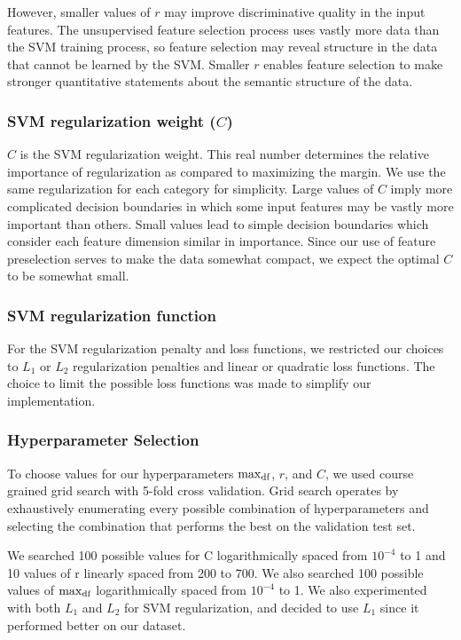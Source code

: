 However, smaller values of $r$ may improve discriminative quality in the input features.
The unsupervised feature selection process uses vastly more data than the SVM training process, so feature selection may reveal structure in the data that cannot be learned by the SVM.
Smaller $r$ enables feature selection to make stronger quantitative statements about the semantic structure of the data.

\subsubsection{SVM regularization weight ($C$)}
$C$ is the SVM regularization weight.
This real number determines the relative importance of regularization as compared to maximizing the margin.
We use the same regularization for each category for simplicity.
Large values of $C$ imply more complicated decision boundaries in which some input features may be vastly more important than others.
Small values lead to simple decision boundaries which consider each feature dimension similar in importance.
Since our use of feature preselection serves to make the data somewhat compact, we expect the optimal $C$ to be somewhat small.

\subsubsection{SVM regularization function}
For the SVM regularization penalty and loss functions, we restricted our choices to $L_1$ or $L_2$ regularization penalties and linear or quadratic loss functions.
The choice to limit the possible loss functions was made to simplify our implementation.

\subsubsection{Hyperparameter Selection}
To choose values for our hyperparameters $\max_{\text{df}}$, $r$, and $C$, we used course grained grid search with 5-fold cross validation.
Grid search operates by exhaustively enumerating every possible combination of hyperparameters and selecting the combination that performs the best on the validation test set.

We searched 100 possible values for C logarithmically spaced from $10^{-4}$ to 1 and 10 values of r linearly spaced from 200 to 700.
We also searched 100 possible values of $\max_{\text{df}}$ logarithmically spaced from $10^{-4}$ to 1. We also experimented with both $L_1$ and $L_2$ for SVM regularization, and decided to use $L_1$
since it performed better on our dataset.


